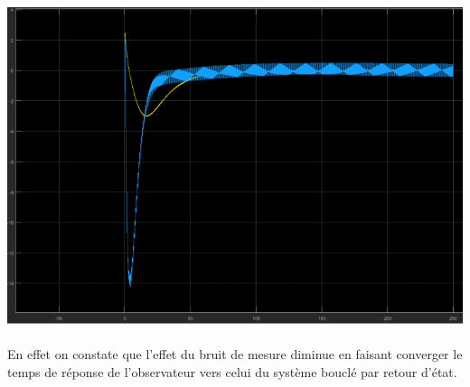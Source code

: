 		
		\begin{center}
		\includegraphics[scale=0.5]{chap2.png} 
		\label{fig14}
		\end{center}	
		
		\paragraph{} En effet on constate que l'effet du bruit de mesure diminue en faisant converger le temps de réponse de l'observateur vers celui du système bouclé par retour d'état.